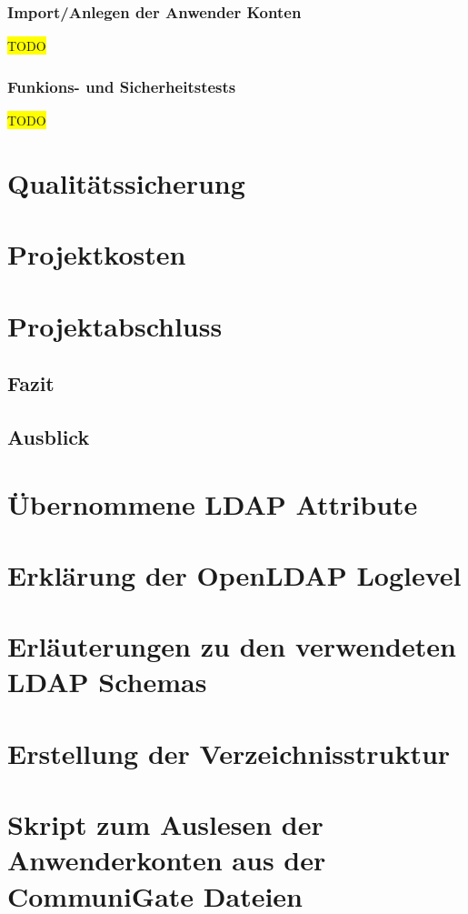 \documentclass[11pt,a4paper,titlepage=firstiscover]{scrartcl} %
\newcommand{\hilight}[1]{\colorbox{yellow}{#1}} %
\begin{document}
\subsubsection{Import/Anlegen der Anwender Konten}
\hilight{TODO}
\subsubsection{Funkions- und Sicherheitstests}
\hilight{TODO}


\newpage
\section{Qualit\"atssicherung}
\section{Projektkosten}
\section{Projektabschluss}
\subsection{Fazit}
\subsection{Ausblick}

\appendix
{} %
\newpage
\section{\"Ubernommene LDAP Attribute} \label{sec:LDAP-Attribute}
\newpage
\section{Erkl\"arung der OpenLDAP Loglevel} \label{sec:LDAP-Loglevel}
\newpage
\section{Erl\"auterungen zu den verwendeten LDAP Schemas}\label{sec:LDAP-Schema}
\newpage
\section{Erstellung der Verzeichnisstruktur}\label{sec:Erstelle-DB}
\newpage
\section{Skript zum Auslesen der Anwenderkonten aus der CommuniGate Dateien}\label{sec:SkriptA}
\newpage
\end{document}
